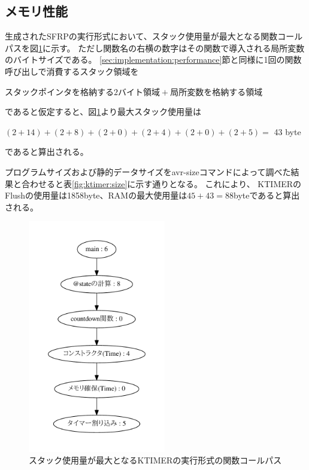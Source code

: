 \subsection{メモリ性能}
生成されたSFRPの実行形式において、スタック使用量が最大となる関数コールパスを図\ref{fig:ktimer:call_graph}に示す。
ただし関数名の右横の数字はその関数で導入される局所変数のバイトサイズである。
\ref{sec:implementation:performance}節と同様に1回の関数呼び出しで消費するスタック領域を
\begin{center}
$スタックポインタを格納する2バイト領域 + 局所変数を格納する領域$
\end{center}
であると仮定すると、図\ref{fig:ktimer:call_graph}より最大スタック使用量は
\begin{center}
$(2 + 14) + (2 + 8) + (2 + 0) + (2 + 4) + (2 + 0) + (2 + 5) =$ 43 byte\\
\end{center}
であると算出される。


プログラムサイズおよび静的データサイズをavr-sizeコマンドによって調べた結果と合わせると表\ref{fig:ktimer:size}に示す通りとなる。
これにより、 KTIMERのFlushの使用量は1858byte、RAMの最大使用量は$45+43=$88byteであると算出される。

\begin{figure}[h]
 \begin{center}
  \includegraphics[width=60mm]{figure/call_graph_ktimer.pdf}
 \end{center}
 \caption{スタック使用量が最大となるKTIMERの実行形式の関数コールパス}
 \label{fig:ktimer:call_graph}
\end{figure}

